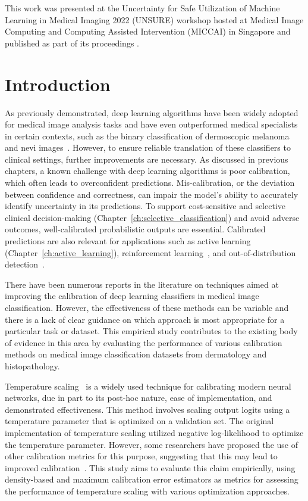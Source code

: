 This work was presented at the Uncertainty for Safe Utilization of Machine Learning in Medical Imaging 2022 (UNSURE) workshop hosted at Medical Image Computing and Computing Assisted Intervention (MICCAI) in Singapore and published as part of its proceedings \citep{carse2022calibration}.



\section{Introduction}
\label{sec:calibration_introduction}
As previously demonstrated, deep learning algorithms have been widely adopted for medical image analysis tasks and have even outperformed medical specialists in certain contexts, such as the binary classification of dermoscopic melanoma and nevi images~\citep{maron2019systematic}. However, to ensure reliable translation of these classifiers to clinical settings, further improvements are necessary. As discussed in previous chapters, a known challenge with deep learning algorithms is poor calibration, which often leads to overconfident predictions. Mis-calibration, or the deviation between confidence and correctness, can impair the model's ability to accurately identify uncertainty in its predictions. To support cost-sensitive and selective clinical decision-making (Chapter~\ref{ch:selective_classification}) and avoid adverse outcomes, well-calibrated probabilistic outputs are essential. Calibrated predictions are also relevant for applications such as active learning (Chapter~\ref{ch:active_learning}), reinforcement learning~\citep{dai2020federated}, and out-of-distribution detection~\citep{ulmer2020trust}.

There have been numerous reports in the literature on techniques aimed at improving the calibration of deep learning classifiers in medical image classification. However, the effectiveness of these methods can be variable and there is a lack of clear guidance on which approach is most appropriate for a particular task or dataset. This empirical study contributes to the existing body of evidence in this area by evaluating the performance of various calibration methods on medical image classification datasets from dermatology and histopathology.

Temperature scaling~\cite{guo2017calibration} is a widely used technique for calibrating modern neural networks, due in part to its post-hoc nature, ease of implementation, and demonstrated effectiveness. This method involves scaling output logits using a temperature parameter that is optimized on a validation set. The original implementation of temperature scaling utilized negative log-likelihood to optimize the temperature parameter. However, some researchers have proposed the use of other calibration metrics for this purpose, suggesting that this may lead to improved calibration~\cite{mukhoti2020calibrating,frenkel2021network}. This study aims to evaluate this claim empirically, using density-based and maximum calibration error estimators as metrics for assessing the performance of temperature scaling with various optimization approaches.

